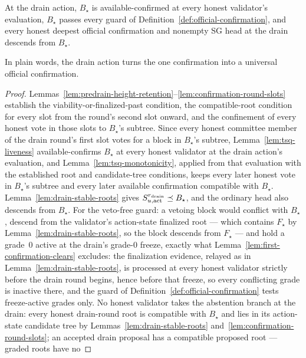 \begin{lemma}
\label{lem:drain-confirms}
At the drain action, \(B_\star\) is available-confirmed at every
honest validator's evaluation, \(B_\star\) passes every guard of
Definition~\ref{def:official-confirmation}, and every honest deepest
official confirmation and nonempty SG head at the drain descends from
\(B_\star\).

In plain words, the drain action turns the one confirmation into a
universal official confirmation.
\end{lemma}

\begin{proof}
Lemmas~\ref{lem:predrain-height-retention}--\ref{lem:confirmation-round-slots}
establish the viability-or-finalized-past condition, the compatible-root
condition for every slot from the round's second slot onward, and the
confinement of every honest vote in those slots to \(B_\star\)'s
subtree.  Since every honest committee member of the drain
round's first slot votes for a block in \(B_\star\)'s subtree,
Lemma~\ref{lem:tsq-liveness} available-confirms \(B_\star\) at every
honest validator at the drain action's evaluation, and
Lemma~\ref{lem:tsq-monotonicity}, applied from that evaluation with the
established root and candidate-tree conditions, keeps every later honest
vote in \(B_\star\)'s subtree and every later available confirmation
compatible with \(B_\star\).  Lemma~\ref{lem:drain-stable-roots} gives
\(S_{u,\mathrm{act}}^{r_{\rm drain}}\preceq B_\star\), and the ordinary head
also descends from \(B_\star\).  For the veto-free guard: a vetoing
block would conflict with \(B_\star\), descend from the validator's
action-state finalized root --- which contains \(F_\star\) by
Lemma~\ref{lem:drain-stable-roots}, so the block descends from \(F_\star\) ---
and hold a grade~0 active at the drain's grade-0 freeze, exactly what
Lemma~\ref{lem:first-confirmation-clears} excludes: the finalization evidence, relayed as in
Lemma~\ref{lem:drain-stable-roots}, is processed at every honest
validator strictly before the drain round begins, hence before that freeze, so every conflicting grade is inactive
there, and the guard of
Definition~\ref{def:official-confirmation} tests freeze-active grades
only.
No honest validator takes the abstention branch at the drain: every
honest drain-round root is compatible with \(B_\star\) and lies in its action-state candidate tree by
Lemmas~\ref{lem:drain-stable-roots}
and~\ref{lem:confirmation-round-slots}; an accepted drain
proposal has a compatible proposed root --- graded roots have no

\end{proof}
